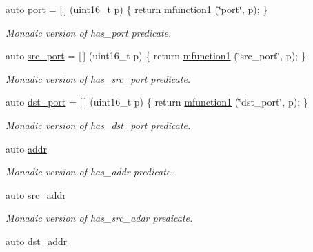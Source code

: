 \begin{DoxyCompactItemize}
auto \hyperlink{namespacepfq_1_1lang_1_1anonymous__namespace_02default_8hpp_03_a868eca03290a037cb4e9b7075085888b}{port} = \mbox{[}$\,$\mbox{]} (uint16\+\_\+t p) \{ return \hyperlink{namespacepfq_1_1lang_a68d775c68562fbd0ab9ef213f2519499}{mfunction1} (\char`\"{}port\char`\"{}, p); \}
\begin{DoxyCompactList}\small\item\em Monadic version of {\ttfamily has\+\_\+port} predicate. \end{DoxyCompactList}\item 
auto \hyperlink{namespacepfq_1_1lang_1_1anonymous__namespace_02default_8hpp_03_ad1645151270994a4f396565b70233b73}{src\+\_\+port} = \mbox{[}$\,$\mbox{]} (uint16\+\_\+t p) \{ return \hyperlink{namespacepfq_1_1lang_a68d775c68562fbd0ab9ef213f2519499}{mfunction1} (\char`\"{}src\+\_\+port\char`\"{}, p); \}
\begin{DoxyCompactList}\small\item\em Monadic version of {\ttfamily has\+\_\+src\+\_\+port} predicate. \end{DoxyCompactList}\item 
auto \hyperlink{namespacepfq_1_1lang_1_1anonymous__namespace_02default_8hpp_03_a25a3b35caf255c109a6c5b4f601b1b61}{dst\+\_\+port} = \mbox{[}$\,$\mbox{]} (uint16\+\_\+t p) \{ return \hyperlink{namespacepfq_1_1lang_a68d775c68562fbd0ab9ef213f2519499}{mfunction1} (\char`\"{}dst\+\_\+port\char`\"{}, p); \}
\begin{DoxyCompactList}\small\item\em Monadic version of {\ttfamily has\+\_\+dst\+\_\+port} predicate. \end{DoxyCompactList}\item 
auto \hyperlink{namespacepfq_1_1lang_1_1anonymous__namespace_02default_8hpp_03_a13cabe468839119d8d68540e3c60718b}{addr}
\begin{DoxyCompactList}\small\item\em Monadic version of {\ttfamily has\+\_\+addr} predicate. \end{DoxyCompactList}\item 
auto \hyperlink{namespacepfq_1_1lang_1_1anonymous__namespace_02default_8hpp_03_a2ee09b5a65a64d60bc797b2ecd1c8a4a}{src\+\_\+addr}
\begin{DoxyCompactList}\small\item\em Monadic version of {\ttfamily has\+\_\+src\+\_\+addr} predicate. \end{DoxyCompactList}\item 
auto \hyperlink{namespacepfq_1_1lang_1_1anonymous__namespace_02default_8hpp_03_a3f51de44baa33ff19a94995945636072}{dst\+\_\+addr}

\end{DoxyCompactItemize}
